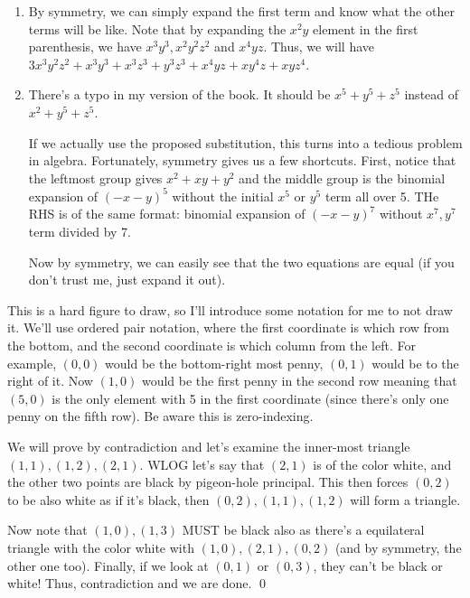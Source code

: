 \setcounter{Exercise}{5}

\begin{Exercise}
	\begin{enumerate}
		\item By symmetry, we can simply expand the first term and know what the other terms will be like.
		Note that by expanding the $x^2y$ element in the first parenthesis, we have $x^3y^3, x^2y^2z^2$ and $x^4yz$.
		Thus, we will have $3x^3y^2z^2 + x^3y^3 + x^3z^3 + y^3z^3 + x^4yz + xy^4z + xyz^4$.

		\item There's a typo in my version of the book.
		It should be $x^5 + y^5 + z^5$ instead of $x^2 + y^5 + z^5$.

		If we actually use the proposed substitution, this turns into a tedious problem in algebra.
		Fortunately, symmetry gives us a few shortcuts.
		First, notice that the leftmost group gives $x^2 + xy + y^2$ and the middle group is the binomial expansion of $(-x-y)^5$ without the initial $x^5$ or $y^5$ term all over 5. 
		THe RHS is of the same format: binomial expansion of $(-x-y)^7$ without $x^7, y^7$ term divided by 7.

		Now by symmetry, we can easily see that the two equations are equal (if you don't trust me, just expand it out).
	\end{enumerate}
\end{Exercise}

\begin{Exercise}
	This is a hard figure to draw, so I'll introduce some notation for me to not draw it. 
	We'll use ordered pair notation, where the first coordinate is which row from the bottom, and the second coordinate is which column from the left.
	For example, $(0,0)$ would be the bottom-right most penny, $(0,1)$ would be to the right of it.
	Now $(1,0)$ would be the first penny in the second row meaning that $(5,0)$ is the only element with 5 in the first coordinate (since there's only one penny on the fifth row).
	Be aware this is zero-indexing.

	We will prove by contradiction and let's examine the inner-most triangle $(1,1), (1,2), (2,1)$. 
	WLOG let's say that $(2,1)$ is of the color white, and the other two points are black by pigeon-hole principal.
	This then forces $(0,2)$ to be also white as if it's black, then $(0,2), (1,1), (1,2)$ will form a triangle.

	Now note that $(1, 0), (1, 3)$ MUST be black also as there's a equilateral triangle with the color white with $(1,0),(2,1),(0,2)$ (and by symmetry, the other one too).
	Finally, if we look at $(0,1)$ or $(0,3)$, they can't be black or white! 
	Thus, contradiction and we are done. \qed
\end{Exercise}


